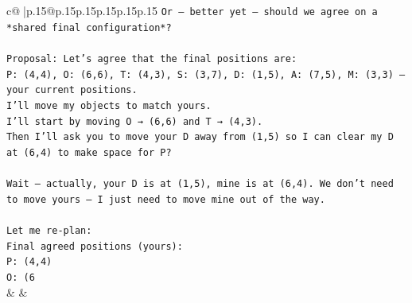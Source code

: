 \documentclass{article}
\begin{document}
{\begin{supertabular}{c@{$\;$}|p{.15\linewidth}@{}p{.15\linewidth}p{.15\linewidth}p{.15\linewidth}p{.15\linewidth}p{.15\linewidth}}
{{{\texttt{Or — better yet — should we agree on a *shared final configuration*?  } \\
\\ 
\texttt{Proposal: Let’s agree that the final positions are:  } \\
\texttt{P: (4,4), O: (6,6), T: (4,3), S: (3,7), D: (1,5), A: (7,5), M: (3,3) — your current positions.  } \\
\texttt{I’ll move my objects to match yours.  } \\
\texttt{I’ll start by moving O → (6,6) and T → (4,3).  } \\
\texttt{Then I’ll ask you to move your D away from (1,5) so I can clear my D at (6,4) to make space for P?  } \\
\\ 
\texttt{Wait — actually, your D is at (1,5), mine is at (6,4). We don’t need to move yours — I just need to move mine out of the way.  } \\
\\ 
\texttt{Let me re{-}plan:  } \\
\texttt{Final agreed positions (yours):  } \\
\texttt{P: (4,4)  } \\
\texttt{O: (6} \\
            }
        }
    }
    & & \\ \\


\end{supertabular}}
\end{document}
